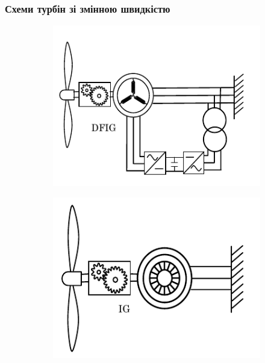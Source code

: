 \documentclass{beamer}
\begin{document}
    \begin{frame}
        \frametitle{Схеми турбін зі змінною швидкістю}
        \begin{figure}[h!]
            \centering
            \begin{subfigure}[t]{0.2\textwidth}
                \centering
                \includegraphics[width=\textwidth]{Pictures/FSIGWT.png}
                \caption{}
            \end{subfigure}
            \hfill
            \begin{subfigure}[t]{0.2\textwidth}
                \centering
                \includegraphics[width=\textwidth]{Pictures/DFIGVSWT.png}
                \caption{}
            \end{subfigure}
    

\end{figure}
\end{frame}
\end{document}
